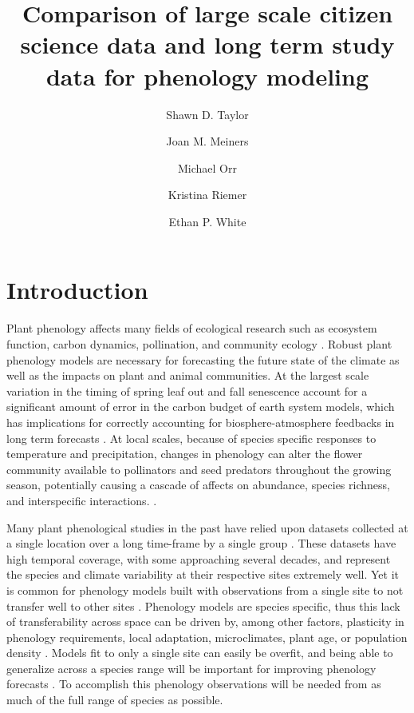 \documentclass[fleqn,10pt,lineno]{wlpeerj} %
\title{Comparison of large scale citizen science data and long term study data for phenology modeling}
\author[1]{Shawn D. Taylor}
\author[2]{Joan M. Meiners}
\author[3]{Michael Orr}
\author[4]{Kristina Riemer}
\author[5]{Ethan P. White}
\affil[1,2]{UFL SNRE}
\affil[3]{???}
\affil[4,5]{UFL WEC}
\affil[5]{UFL Bioinformatics}
\begin{document}
\flushbottom
\maketitle
\thispagestyle{empty}

\section*{Introduction}


Plant phenology affects many fields of ecological research such as ecosystem function, carbon dynamics, pollination, and community ecology \citep{richardson2013, cleland2007, tang2016}. Robust plant phenology models are necessary for forecasting the future state of the climate as well as the impacts on plant and animal communities. At the largest scale variation in the timing of spring leaf out and fall senescence account for a significant amount of error in the carbon budget of earth system models, which has implications for correctly accounting for biosphere-atmosphere feedbacks in long term forecasts \citep{richardson2012}. At local scales, because of species specific responses to temperature and precipitation, changes in phenology can alter the flower community available to pollinators and seed predators throughout the growing season, potentially causing a cascade of affects on abundance, species richness, and interspecific interactions. \citep{diez2012, caradonna2014, ogilvie2017, theobald2017}. 

Many plant phenological studies in the past have relied upon datasets collected at a single location over a long time-frame by a single group \citep{cook2012, roberts2015, iler2013, wolkovich2012}. These datasets have high temporal coverage, with some approaching several decades, and represent the species and climate variability at their respective sites extremely well. Yet it is common for phenology models built with observations from a single site to not transfer well to other sites \citep{garcia-mozo2008, xu2013, olsson2014, basler2016}. Phenology models are species specific, thus this lack of transferability across space can be driven by, among other factors, plasticity in phenology requirements, local adaptation, microclimates, plant age, or population density \citep{kramer1995,diez2012}. Models fit to only a single site can easily be overfit, and being able to generalize across a species range will be important for improving phenology forecasts \citep{richardson2013}. To accomplish this phenology observations will be needed from as much of the full range of species as possible. 
\end{document}
